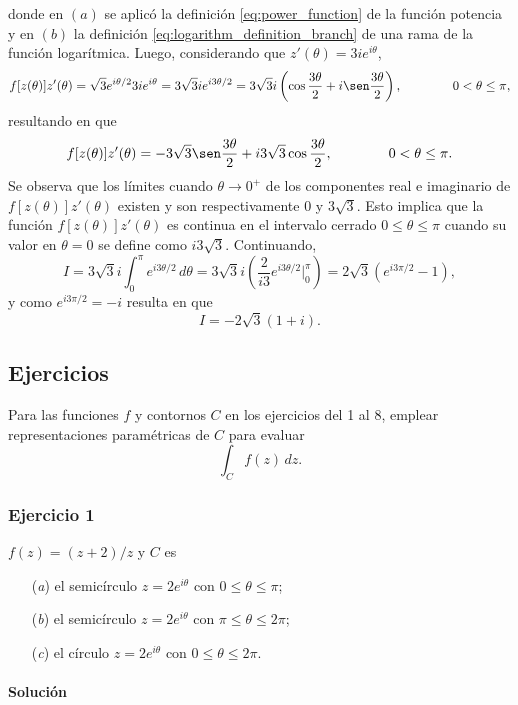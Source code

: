 \documentclass[a4paper]{report}
\begin{document}
donde en \((a)\) se aplicó la definición \ref{eq:power_function} de la función potencia y en \((b)\) la definición \ref{eq:logarithm_definition_branch} de una rama de la función logarítmica. Luego, considerando que \(z'(\theta)=3ie^{i\theta}\),
\[
 f[z(\theta)]z'(\theta)=\sqrt{3}e^{i\theta/2}3ie^{i\theta}=3\sqrt{3}ie^{i3\theta/2}
 =3\sqrt{3}i\left(\cos\frac{3\theta}{2}+i\sen\frac{3\theta}{2}\right),
 \qquad\qquad 0<\theta\leq\pi,
\]
resultando en que 
\[
 f[z(\theta)]z'(\theta)=-3\sqrt{3}\sen\frac{3\theta}{2}+i3\sqrt{3}\cos\frac{3\theta}{2},
 \qquad\qquad 0<\theta\leq\pi.
\]
Se observa que los límites cuando \(\theta\to0^+\) de los componentes real e imaginario de \(f[z(\theta)]z'(\theta)\) existen y son respectivamente \(0\) y \(3\sqrt{3}\). Esto implica que la función \(f[z(\theta)]z'(\theta)\) es continua en el intervalo cerrado \(0\leq\theta\leq\pi\) cuando su valor en \(\theta=0\) se define como \(i3\sqrt{3}\). Continuando,
\[
 I=3\sqrt{3}i\int_0^\pi e^{i3\theta/2}\,d\theta
 =3\sqrt{3}i\left(\frac{2}{i3}e^{i3\theta/2}\bigg|_0^\pi\right)
 =2\sqrt{3}\left(e^{i3\pi/2}-1\right),
\]
y como \(e^{i3\pi/2}=-i\) resulta en que 
\[
 I=-2\sqrt{3}(1+i).
\]


\subsection*{Ejercicios}

Para las funciones \(f\) y contornos \(C\) en los ejercicios del 1 al 8, emplear representaciones paramétricas de \(C\) para evaluar
\[
 \int_C f(z)\,dz.
\]

\subsubsection{Ejercicio 1}

\(f(z)=(z+2)/z\) y \(C\) es
\begin{itemize}
 \item[(\textit{a})] el semicírculo \(z=2e^{i\theta}\) con \(0\leq\theta\leq\pi\);
 \item[(\textit{b})] el semicírculo \(z=2e^{i\theta}\) con \(\pi\leq\theta\leq2\pi\);
 \item[(\textit{c})] el círculo \(z=2e^{i\theta}\) con \(0\leq\theta\leq2\pi\).
\end{itemize}

\paragraph{Solución}
\end{document}

